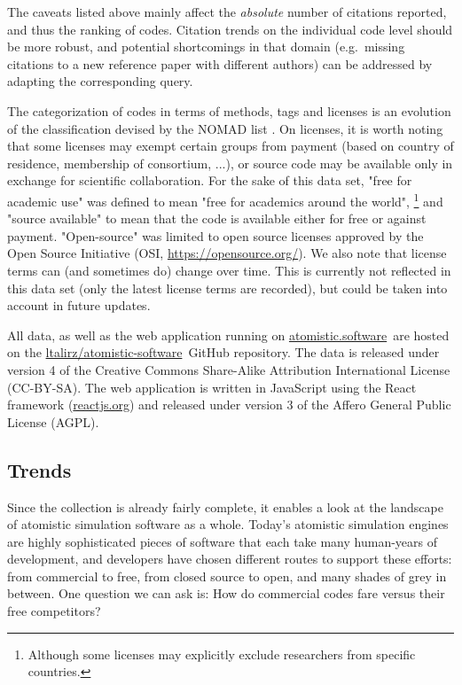 \documentclass[9pt,review]{livecoms}
\newcommand{\atsoft}{\href{https://atomistic.software}{atomistic.software}\ }
\newcommand{\atsoftgit}{\href{https://github.com/ltalirz/atomistic-software}{ltalirz/atomistic-software}\ }
\begin{document}
The caveats listed above mainly affect the \emph{absolute} number of citations reported, and thus the ranking of codes.
Citation trends on the individual code level should be more robust, and potential shortcomings in that domain (e.g.\ missing citations to a new reference paper with different authors) can be addressed by adapting the corresponding query.

The categorization of codes in terms of methods, tags and licenses is an evolution of the classification devised by the NOMAD list \cite{Ghiringhelli2017}.
On licenses, it is worth noting that some licenses may exempt certain groups from payment (based on country of residence, membership of consortium, ...), or source code may be available only in exchange for scientific collaboration.
For the sake of this data set, "free for academic use" was defined to mean "free for academics around the world", %
\footnote{Although some licenses may explicitly exclude researchers from specific countries.}
and "source available" to mean that the code is available either for free or against payment. 
"Open-source" was limited to open source licenses approved by the Open Source Initiative (OSI, \url{https://opensource.org/}).
We also note that license terms can (and sometimes do) change over time. 
This is currently not reflected in this data set (only the latest license terms are recorded), but could be taken into account in future updates.

All data, as well as the web application running on \atsoft are hosted on the \atsoftgit GitHub repository.
The data is released under version 4 of the Creative Commons Share-Alike Attribution International License (CC-BY-SA).
The web application is written in JavaScript using the React framework (\url{reactjs.org}) and released under version 3 of the Affero General Public License (AGPL).

\subsection{Trends}

Since the collection is already fairly complete, it enables a look at the landscape of atomistic simulation software as a whole. 
Today's atomistic simulation engines are highly sophisticated pieces of software that each take many human-years of development, and developers have chosen different routes to support these efforts: 
from commercial to free, from closed source to open, and many shades of grey in between.
One question we can ask is: How do commercial codes fare versus their free competitors?
\end{document}
